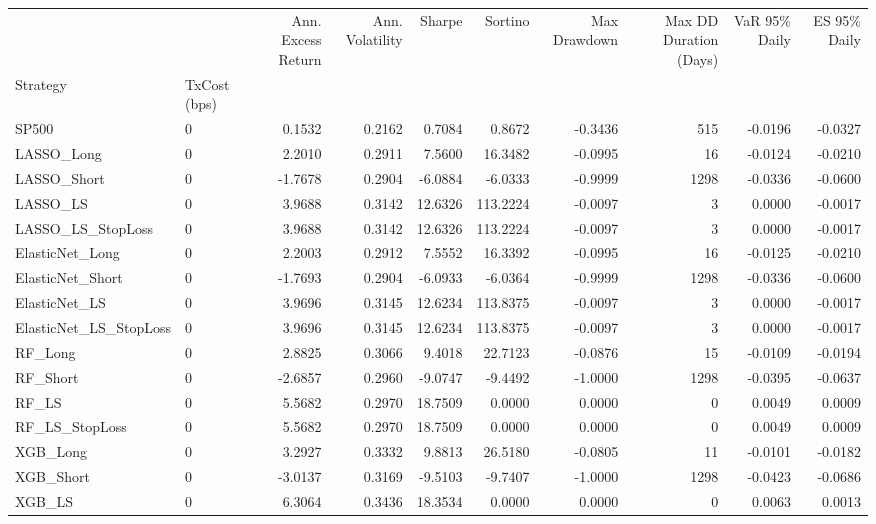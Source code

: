\begin{tabular}{llrrrrrrrr}
\toprule
 &  & Ann. Excess Return & Ann. Volatility & Sharpe & Sortino & Max Drawdown & Max DD Duration (Days) & VaR 95\% Daily & ES 95\% Daily \\
Strategy & TxCost (bps) &  &  &  &  &  &  &  &  \\
\midrule
SP500 & 0 & 0.1532 & 0.2162 & 0.7084 & 0.8672 & -0.3436 & 515 & -0.0196 & -0.0327 \\
\cline{1-10}
LASSO\_Long & 0 & 2.2010 & 0.2911 & 7.5600 & 16.3482 & -0.0995 & 16 & -0.0124 & -0.0210 \\
\cline{1-10}
LASSO\_Short & 0 & -1.7678 & 0.2904 & -6.0884 & -6.0333 & -0.9999 & 1298 & -0.0336 & -0.0600 \\
\cline{1-10}
LASSO\_LS & 0 & 3.9688 & 0.3142 & 12.6326 & 113.2224 & -0.0097 & 3 & 0.0000 & -0.0017 \\
\cline{1-10}
LASSO\_LS\_StopLoss & 0 & 3.9688 & 0.3142 & 12.6326 & 113.2224 & -0.0097 & 3 & 0.0000 & -0.0017 \\
\cline{1-10}
ElasticNet\_Long & 0 & 2.2003 & 0.2912 & 7.5552 & 16.3392 & -0.0995 & 16 & -0.0125 & -0.0210 \\
\cline{1-10}
ElasticNet\_Short & 0 & -1.7693 & 0.2904 & -6.0933 & -6.0364 & -0.9999 & 1298 & -0.0336 & -0.0600 \\
\cline{1-10}
ElasticNet\_LS & 0 & 3.9696 & 0.3145 & 12.6234 & 113.8375 & -0.0097 & 3 & 0.0000 & -0.0017 \\
\cline{1-10}
ElasticNet\_LS\_StopLoss & 0 & 3.9696 & 0.3145 & 12.6234 & 113.8375 & -0.0097 & 3 & 0.0000 & -0.0017 \\
\cline{1-10}
RF\_Long & 0 & 2.8825 & 0.3066 & 9.4018 & 22.7123 & -0.0876 & 15 & -0.0109 & -0.0194 \\
\cline{1-10}
RF\_Short & 0 & -2.6857 & 0.2960 & -9.0747 & -9.4492 & -1.0000 & 1298 & -0.0395 & -0.0637 \\
\cline{1-10}
RF\_LS & 0 & 5.5682 & 0.2970 & 18.7509 & 0.0000 & 0.0000 & 0 & 0.0049 & 0.0009 \\
\cline{1-10}
RF\_LS\_StopLoss & 0 & 5.5682 & 0.2970 & 18.7509 & 0.0000 & 0.0000 & 0 & 0.0049 & 0.0009 \\
\cline{1-10}
XGB\_Long & 0 & 3.2927 & 0.3332 & 9.8813 & 26.5180 & -0.0805 & 11 & -0.0101 & -0.0182 \\
\cline{1-10}
XGB\_Short & 0 & -3.0137 & 0.3169 & -9.5103 & -9.7407 & -1.0000 & 1298 & -0.0423 & -0.0686 \\
\cline{1-10}
XGB\_LS & 0 & 6.3064 & 0.3436 & 18.3534 & 0.0000 & 0.0000 & 0 & 0.0063 & 0.0013 \\

\end{tabular}
